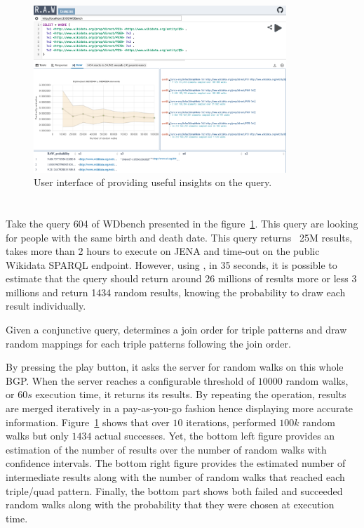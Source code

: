 
\begin{figure}
  \centering
  \includegraphics[width=0.85\textwidth]{figures/raw_screenshot.png}
  \caption{\label{fig:raw_screenshot}User interface of \NAME providing useful insights on the query.}
\end{figure}


 \section{\NAME}
 

 
 Take the query 604 of WDbench presented in the
 figure~\ref{fig:raw_screenshot}. This query are looking for people
 with the same birth and death date. This query returns ~25M results,
 takes more than 2 hours to execute on JENA and time-out on the public
 Wikidata SPARQL endpoint. However, using \NAME,
 in 35 seconds, it is possible to estimate that the query should
 return around 26 millions of results more or less 3 millions and
 return 1434 random results, knowing the probability to draw each
 result individually.

 Given a conjunctive query, \NAME determines a join order for triple
 patterns and draw random mappings for each triple patterns following
 the join order.

 

 
 

By pressing the play button, it asks the server
for random walks on this whole BGP. When the server reaches a
configurable threshold of $10 000$ random walks, or $60s$ execution
time, it returns its results. By repeating the operation, results are
merged iteratively in a pay-as-you-go fashion hence displaying more
accurate information. Figure~\ref{fig:raw_screenshot} shows that over
$10$ iterations, \NAME performed $100k$ random walks but only $1434$
actual successes.  Yet, the bottom left figure provides an estimation
of the number of results over the number of random walks with
confidence intervals. The bottom right figure provides the estimated
number of intermediate results along with the number of random walks
that reached each triple/quad pattern.  Finally, the bottom part shows
both failed and succeeded random walks along with the probability that
they were chosen at execution time.

